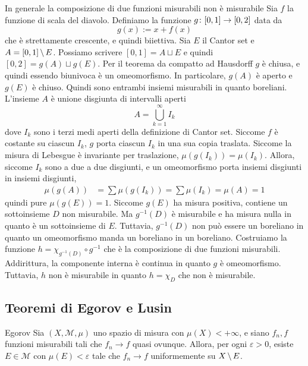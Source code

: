 \documentclass[a4paper]{article}
\begin{document}
\begin{radioactive}
\begin{snippetexample}{In generale la composizione di due funzioni misurabili non è misurabile}
    Sia \(f\) la funzione di scala del diavolo. Definiamo la funzione
    \(g \colon [0,1] \to [0,2]\) data da \[
        g(x) := x + f(x)
    \]
    che è strettamente crescente, e quindi biiettiva.
    Sia \(E\) il Cantor set e \(A = [0,1] \,\backslash\, E\).
    Possiamo scrivere \([0,1] = A \sqcup E\) e quindi
    \([0,2] = g(A) \sqcup g(E)\). Per il teorema da compatto ad Hausdorff \(g\)
    è chiusa, e quindi essendo biunivoca è un omeomorfismo.
    In particolare, \(g(A)\) è aperto e \(g(E)\) è chiuso.
    Quindi sono entrambi insiemi misurabili in quanto boreliani.
    L'insieme \(A\) è unione disgiunta di intervalli aperti
    \[
        A =\bigcup_{k=1}^\infty I_k
    \]
    dove \(I_k\) sono i terzi medi aperti della definizione di Cantor set.
    Siccome \(f\) è costante su ciascun \(I_k\), \(g\) porta ciascun \(I_k\)
    in una sua copia traslata. Siccome la misura di Lebesgue è invariante per traslazione,
    \(\mu(g(I_k)) = \mu(I_k)\). Allora, siccome \(I_k\) sono a due a due disgiunti,
    e un omeomorfismo porta insiemi disgiunti in insiemi disgiunti,
    \begin{align*}
        \mu(g(A)) &= \sum \mu(g(I_k)) = \sum \mu(I_k) = \mu(A) = 1
    \end{align*}
    quindi pure \(\mu(g(E)) = 1\).
    Siccome \(g(E)\) ha misura positiva, contiene un sottoinsieme \(D\) non misurabile.
    Ma \(g^{-1}(D)\) è misurabile e ha misura nulla in quanto
    è un sottoinsieme di \(E\). Tuttavia, \(g^{-1}(D)\) non può essere un boreliano
    in quanto un omeomorfismo manda un boreliano in un boreliano.
    Costruiamo la funzione \(h = \chi_{g^{-1}(D)} \circ g^{-1}\)
    che è la composizione di due funzioni misurabili. Addirittura, la componente interna è continua
    in quanto \(g\) è omeomorfismo.
    Tuttavia, \(h\) non è misurabile in quanto \(h = \chi_D\) che non è misurabile.
\end{snippetexample}
\end{radioactive}

\subsection{Teoremi di Egorov e Lusin}

\begin{radioactive}
\begin{snippettheorem}{Egorov}
    Sia \((X,\mathcal M,\mu)\) uno spazio di misura con \(\mu(X)<+\infty\), e siano
    \(f_n,f\) funzioni misurabili tali che \(f_n\to f\) quasi ovunque. Allora, per
    ogni \(\varepsilon>0\), esiste \(E\in\mathcal M\) con \(\mu(E)<\varepsilon\)
    tale che \(f_n\to f\) uniformemente su \(X\,\backslash\, E\).
\end{snippettheorem}
\end{radioactive}
\end{document}
